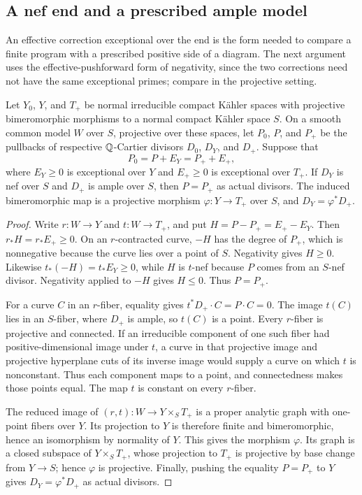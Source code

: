 \subsection{A nef end and a prescribed ample model}

An effective correction exceptional over the end is the form needed to
compare a finite program with a prescribed positive side of a diagram.
The next argument uses the effective-pushforward form of negativity,
since the two corrections need not have the same exceptional primes;
compare \cite[Lemma~2.5]{ProjectiveLCFourfolds} in the projective setting.

\begin{lemma}\label{lem:nef-ample}
Let $Y_0$, $Y$, and $T_+$ be normal irreducible compact K\"ahler spaces
with projective bimeromorphic morphisms to a normal compact K\"ahler
space $S$.  On a smooth common model $W$ over $S$, projective over these
spaces, let $P_0$, $P$, and $P_+$ be the pullbacks of respective
$\mathbb{Q}$-Cartier divisors $D_0$, $D_Y$, and $D_+$.  Suppose that
\[
 P_0=P+E_Y=P_++E_+,
\]
where $E_Y\geq0$ is exceptional over $Y$ and $E_+\geq0$ is exceptional
over $T_+$.  If $D_Y$ is nef over $S$ and $D_+$ is ample over $S$,
then $P=P_+$ as actual divisors.  The induced bimeromorphic map is a
projective morphism $\varphi:Y\to T_+$ over $S$, and
$D_Y=\varphi^*D_+$.
\end{lemma}

\begin{proof}
Write $r:W\to Y$ and $t:W\to T_+$, and put
$H=P-P_+=E_+-E_Y$.  Then $r_*H=r_*E_+\geq0$.  On an $r$-contracted
curve, $-H$ has the degree of $P_+$, which is nonnegative because
the curve lies over a point of $S$.  Negativity gives $H\geq0$.
Likewise $t_*(-H)=t_*E_Y\geq0$, while $H$ is $t$-nef because $P$ comes
from an $S$-nef divisor.  Negativity applied to $-H$ gives $H\leq0$.
Thus $P=P_+$.

For a curve $C$ in an $r$-fiber, equality gives
$t^*D_+\cdot C=P\cdot C=0$.  The image $t(C)$ lies in an $S$-fiber,
where $D_+$ is ample, so $t(C)$ is a point.  Every $r$-fiber is
projective and connected.  If an irreducible component of one such
fiber had positive-dimensional image under $t$, a curve in that
projective image and projective hyperplane cuts of its inverse image
would supply a curve on which $t$ is nonconstant.  Thus each component
maps to a point, and connectedness makes those points equal.  The map
$t$ is constant on every $r$-fiber.

The reduced image of $(r,t):W\to Y\times_ST_+$ is a proper analytic
graph with one-point fibers over $Y$.  Its projection to $Y$ is
therefore finite and bimeromorphic, hence an isomorphism by normality
of $Y$.  This gives the morphism $\varphi$.  Its graph is a closed
subspace of $Y\times_ST_+$, whose projection to $T_+$ is projective
by base change from $Y\to S$; hence $\varphi$ is projective.  Finally,
pushing the equality $P=P_+$ to $Y$ gives
$D_Y=\varphi^*D_+$ as actual divisors.
\end{proof}

